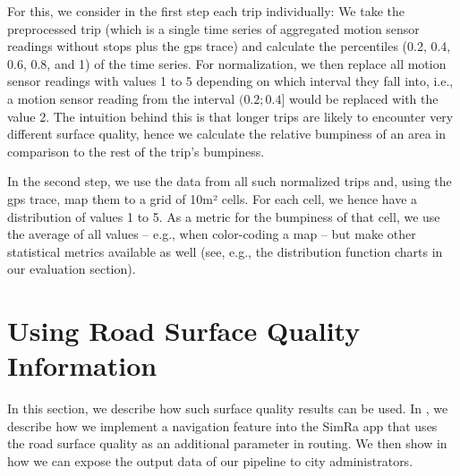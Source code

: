 For this, we consider in the first step each trip individually:
We take the preprocessed trip (which is a single time series of aggregated motion sensor readings without stops plus the \ac{gps} trace) and calculate the percentiles (0.2, 0.4, 0.6, 0.8, and 1) of the time series.
For normalization, we then replace all motion sensor readings with values 1 to 5 depending on which interval they fall into, i.e., a motion sensor reading from the interval $(0.2;0.4]$ would be replaced with the value 2.
The intuition behind this is that longer trips are likely to encounter very different surface quality, hence we calculate the relative bumpiness of an area in comparison to the rest of the trip's bumpiness.

In the second step, we use the data from all such normalized trips and, using the \ac{gps} trace, map them to a grid of 10m² cells.
For each cell, we hence have a distribution of values 1 to 5.
As a metric for the bumpiness of that cell, we use the average of all values -- e.g., when color-coding a map -- but make other statistical metrics available as well (see, e.g., the distribution function charts in our evaluation section).

\section{Using Road Surface Quality Information}
\label{sec:using_road_surface_quality_information}
In this section, we describe how such surface quality results can be used.
In , we describe how we implement a navigation feature into the SimRa app that uses the road surface quality as an additional parameter in routing.
We then show in  how we can expose the output data of our pipeline to city administrators.


